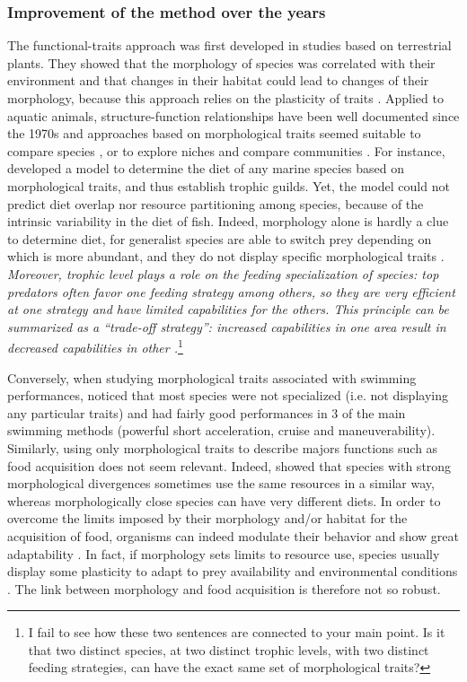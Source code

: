 \subsubsection{Improvement of the method over the years}
The functional-traits approach was first developed in studies based on terrestrial plants. They showed that the morphology of species was correlated with their environment and that changes in their habitat could lead to changes of their morphology, because this approach relies on the plasticity of traits \citep{lavorel1997,martini2020}. Applied to aquatic animals, structure-function relationships have been well documented since the 1970s \citep{gosline1971, lagler1977, webb1984} and approaches based on morphological traits seemed suitable to compare species \citep{norton1995}, or to explore niches and compare communities \citep{winemiller1991}. For instance, \citet{albouy2011} developed a model to determine the diet of any marine species based on morphological traits, and thus establish trophic guilds. Yet, the model could not predict diet overlap nor resource partitioning among species, because of the intrinsic variability in the diet of fish. Indeed, morphology alone is hardly a clue to determine diet, for generalist species are able to switch prey depending on which is more abundant, and they do not display specific morphological traits \citep{sibbing2000}. \emph{Moreover, trophic level plays a role on the feeding specialization of species: top predators often favor one feeding strategy among others, so they are very efficient at one strategy and have limited capabilities for the others. This principle can be summarized as a ``trade-off strategy'': increased capabilities in one area result in  decreased capabilities in other \citep{norton1995}.}\footnote{I fail to see how these two sentences are connected to your main point. Is it that two distinct species, at two distinct trophic levels, with two distinct feeding strategies, can have the exact same set of morphological traits?}

Conversely, when studying morphological traits associated with swimming performances, \citet{webb1984} noticed that most species were not specialized (i.e. not displaying any particular traits) and had fairly good performances in 3 of the main swimming methods (powerful short acceleration, cruise and maneuverability). Similarly, using only morphological traits to describe majors functions such as food acquisition does not seem relevant. Indeed, \citet{grossman2009} showed that species with strong morphological divergences sometimes use the same resources in a similar way, whereas morphologically close species can have very different diets. In order to overcome the limits imposed by their morphology and/or habitat for the acquisition of food, organisms can indeed modulate their behavior and show great adaptability \citep{blondel1979,grossman2009}. In fact, if morphology sets limits to resource use, species usually display some plasticity to adapt to prey availability and environmental conditions \citep{ibanez2007,sibbing2000}. The link between morphology and food acquisition is therefore not so robust. 

